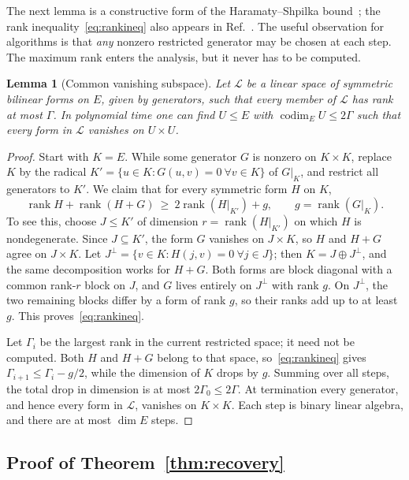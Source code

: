 \documentclass[a4paper,onecolumn,11pt,unpublished]{quantumarticle}
\theoremstyle{plain}
\newtheorem{lemma}[theorem]{Lemma}
\theoremstyle{remark}
\DeclareMathOperator{\rank}{rank}
\DeclareMathOperator{\codim}{codim}
\begin{document}
The next lemma is a constructive form of the Haramaty--Shpilka bound~\cite[Lemma~3.7]{HS10}; the rank inequality~\eqref{eq:rankineq} also appears in Ref.~\cite[Lemma~2.3]{Lam25}. The useful observation for algorithms is that \emph{any} nonzero restricted generator may be chosen at each step. The maximum rank enters the analysis, but it never has to be computed.

\begin{lemma}[Common vanishing subspace]\label{lem:common}
Let $\mathcal L$ be a linear space of symmetric bilinear forms on $E$, given by generators, such that every member of $\mathcal L$ has rank at most $\Gamma$. In polynomial time one can find $U\le E$ with $\codim_EU\le2\Gamma$ such that every form in $\mathcal L$ vanishes on $U\times U$.
\end{lemma}

\begin{proof}
Start with $K=E$. While some generator $G$ is nonzero on $K\times K$, replace $K$ by the radical $K'=\{u\in K:G(u,v)=0\ \forall v\in K\}$ of $G|_K$, and restrict all generators to $K'$. We claim that for every symmetric form $H$ on $K$,
\begin{equation}\label{eq:rankineq}
\rank H+\rank(H+G)\ \ge\ 2\rank(H|_{K'})+g,\qquad g=\rank(G|_K).
\end{equation}
To see this, choose $J\le K'$ of dimension $r=\rank(H|_{K'})$ on which $H$ is nondegenerate. Since $J\subseteq K'$, the form $G$ vanishes on $J\times K$, so $H$ and $H+G$ agree on $J\times K$. Let $J^\perp=\{v\in K:H(j,v)=0\ \forall j\in J\}$; then $K=J\oplus J^\perp$, and the same decomposition works for $H+G$. Both forms are block diagonal with a common rank-$r$ block on $J$, and $G$ lives entirely on $J^\perp$ with rank $g$. On $J^\perp$, the two remaining blocks differ by a form of rank $g$, so their ranks add up to at least $g$. This proves~\eqref{eq:rankineq}.

Let $\Gamma_i$ be the largest rank in the current restricted space; it need not be computed. Both $H$ and $H+G$ belong to that space, so~\eqref{eq:rankineq} gives $\Gamma_{i+1}\le\Gamma_i-g/2$, while the dimension of $K$ drops by $g$. Summing over all steps, the total drop in dimension is at most $2\Gamma_0\le2\Gamma$. At termination every generator, and hence every form in $\mathcal L$, vanishes on $K\times K$. Each step is binary linear algebra, and there are at most $\dim E$ steps.
\end{proof}

\subsection{Proof of Theorem~\ref{thm:recovery}}
\end{document}
